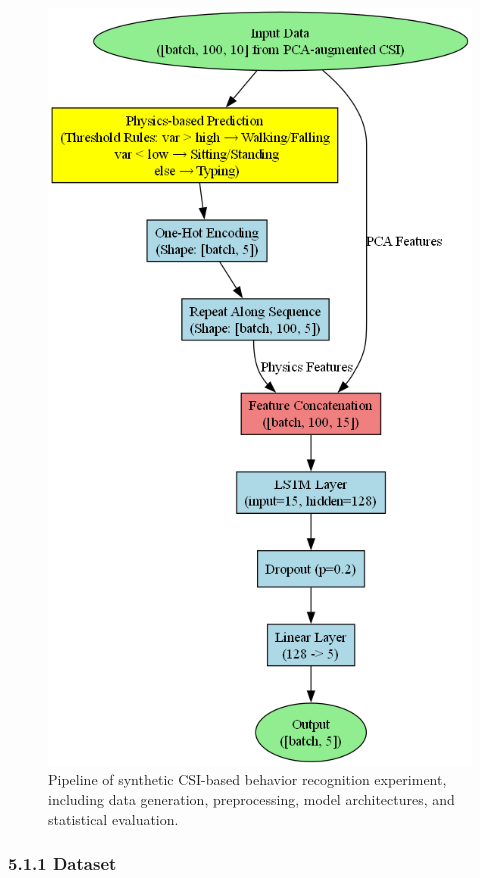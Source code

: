 \documentclass[Afour,sageh,times]{sagej}
\begin{document}
\begin{figure}[htbp]
    \centering
    \includegraphics[width=0.97\linewidth]{10.hybrid_graphviz.png} 
    \caption{Pipeline of synthetic CSI-based behavior recognition experiment, including data generation, preprocessing, model architectures, and statistical evaluation.}
    \label{fig:experiment_flowchart}
\end{figure}
\iffalse
\subsubsection{5.1.1 Dataset}
\end{document}
